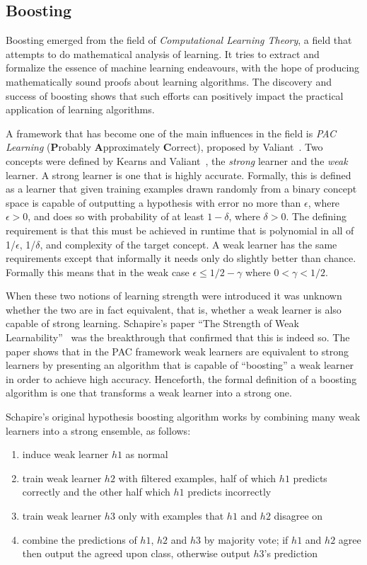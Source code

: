 \subsection{Boosting}
\label{sec:boostingbatch}

Boosting emerged from the field of {\em Computational Learning Theory}, a field that attempts to do mathematical analysis of learning. It tries to extract and formalize the essence of machine learning endeavours, with the hope of producing mathematically sound proofs about learning algorithms. The discovery and success of boosting shows that such efforts can positively impact the practical application of learning algorithms.

A framework that has become one of the main influences in the field is {\em PAC Learning} ({\bf P}robably {\bf A}pproximately {\bf C}orrect), proposed by Valiant~\cite{paclearn}.
Two concepts were defined by Kearns and Valiant~\cite{weakstronglearn}, the {\em strong} learner and the {\em weak} learner. A strong learner is one that is highly accurate. Formally, this is defined as a learner that given training examples drawn randomly from a binary concept space is capable of outputting a hypothesis with error no more than $\epsilon$, where $\epsilon > 0$, and does so with probability of at least $1 - \delta$, where $\delta > 0$. The defining requirement is that this must be achieved in runtime that is polynomial in all of 1/$\epsilon$, 1/$\delta$, and complexity of the target concept. A weak learner has the same requirements except that informally it needs only do slightly better than chance. Formally this means that in the weak case $\epsilon \le 1/2-\gamma$ where $0 < \gamma < 1/2$.

When these two notions of learning strength were introduced it was unknown whether the two are in fact equivalent, that is, whether a weak learner is also capable of strong learning. Schapire's paper ``The Strength of Weak Learnability''~\cite{strength} was the breakthrough that confirmed that this is indeed so. The paper shows that in the PAC framework weak learners are equivalent to strong learners by presenting an algorithm that is capable of ``boosting'' a weak learner in order to achieve high accuracy. Henceforth, the formal definition of a boosting algorithm is one that transforms a weak learner into a strong one.

Schapire's original hypothesis boosting algorithm works by combining many weak learners into a strong ensemble, as follows:

\begin{enumerate}
\item induce weak learner $h1$ as normal
\item train weak learner $h2$ with filtered examples, half of which $h1$ predicts correctly and the other half which $h1$ predicts incorrectly
\item train weak learner $h3$ only with examples that $h1$ and $h2$ disagree on
\item combine the predictions of $h1$, $h2$ and $h3$ by majority vote; if $h1$ and $h2$ agree then output the agreed upon class, otherwise output $h3$'s prediction
\end{enumerate}

